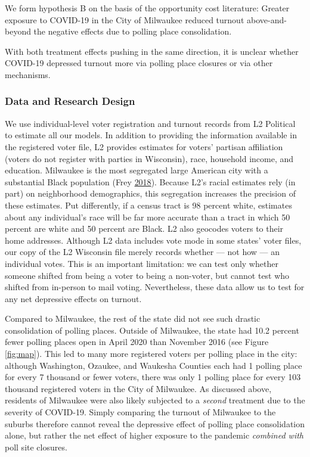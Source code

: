 \documentclass[
  12pt,
]{article}
\begin{document}
We form hypothesis B on the basis of the opportunity cost literature: Greater exposure to COVID-19 in the City of Milwaukee reduced turnout above-and-beyond the negative effects due to polling place consolidation.

With both treatment effects pushing in the same direction, it is unclear whether COVID-19 depressed turnout more via polling place closures or via other mechanisms.

\hypertarget{data-and-research-design}{%
\subsubsection*{Data and Research Design}\label{data-and-research-design}}

We use individual-level voter registration and turnout records from L2 Political to estimate all our models. In addition to providing the information available in the registered voter file, L2 provides estimates for voters' partisan affiliation (voters do not register with parties in Wisconsin), race, household income, and education. Milwaukee is the most segregated large American city with a substantial Black population (Frey \protect\hyperlink{ref-Frey2018}{2018}). Because L2's racial estimates rely (in part) on neighborhood demographics, this segregation increases the precision of these estimates. Put differently, if a census tract is 98 percent white, estimates about any individual's race will be far more accurate than a tract in which 50 percent are white and 50 percent are Black. L2 also geocodes voters to their home addresses. Although L2 data includes vote mode in some states' voter files, our copy of the L2 Wisconsin file merely records whether --- not how --- an individual votes. This is an important limitation: we can test only whether someone shifted from being a voter to being a non-voter, but cannot test who shifted from in-person to mail voting. Nevertheless, these data allow us to test for any net depressive effects on turnout.

Compared to Milwaukee, the rest of the state did not see such drastic consolidation of polling places. Outside of Milwaukee, the state had 10.2 percent fewer polling places open in April 2020 than November 2016 (see Figure \ref{fig:map}). This led to many more registered voters per polling place in the city: although Washington, Ozaukee, and Waukesha Counties each had 1 polling place for every 7 thousand or fewer voters, there was only 1 polling place for every 103 thousand registered voters in the City of Milwaukee. As discussed above, residents of Milwaukee were also likely subjected to a \emph{second} treatment due to the severity of COVID-19. Simply comparing the turnout of Milwaukee to the suburbs therefore cannot reveal the depressive effect of polling place consolidation alone, but rather the net effect of higher exposure to the pandemic \emph{combined with} poll site closures.
\end{document}
